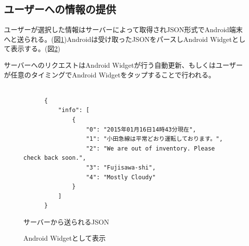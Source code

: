 \subsection{ユーザーへの情報の提供}
ユーザーが選択した情報はサーバーによって取得されJSON形式でAndroid端末へと送られる。(図\ref{fig:JSON})Androidは受け取ったJSONをパースしAndroid Widgetとして表示する。(図\ref{fig:widget})

サーバーへのリクエストはAndroid Widgetが行う自動更新、もしくはユーザーが任意のタイミングでAndroid Widgetをタップすることで行われる。

\begin{figure}[htbp]
  \begin{minipage}{\hsize}
    \begin{center}
      \begin{lstlisting}[basicstyle=\ttfamily\footnotesize, frame=single]

      {
          "info": [
              {
                  "0": "2015年01月16日14時43分現在",
                  "1": "小田急線は平常どおり運転しております。",
                  "2": "We are out of inventory. Please check back soon.",
                  "3": "Fujisawa-shi",
                  "4": "Mostly Cloudy"
              }
          ]
      }

      \end{lstlisting}
    \end{center}
    \caption{サーバーから送られるJSON}
    \label{fig:JSON}
  \end{minipage}
\end{figure}

\begin{figure}[htbp]
  \begin{minipage}{\hsize}
    \begin{center}
    \end{center}
    \caption{Android Widgetとして表示}
    \label{fig:widget}
  \end{minipage}
\end{figure}

\nocite{*}

